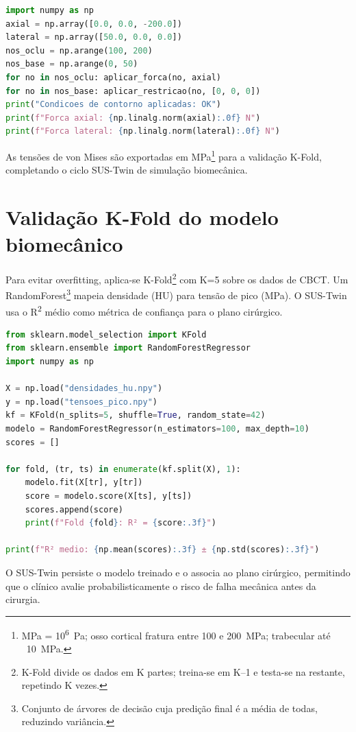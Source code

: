 \begin{lstlisting}[language=Python,caption={Condições de contorno para FEM}]
import numpy as np
axial = np.array([0.0, 0.0, -200.0])
lateral = np.array([50.0, 0.0, 0.0])
nos_oclu = np.arange(100, 200)
nos_base = np.arange(0, 50)
for no in nos_oclu: aplicar_forca(no, axial)
for no in nos_base: aplicar_restricao(no, [0, 0, 0])
print("Condicoes de contorno aplicadas: OK")
print(f"Forca axial: {np.linalg.norm(axial):.0f} N")
print(f"Forca lateral: {np.linalg.norm(lateral):.0f} N")
\end{lstlisting}

As tensões de von Mises são exportadas em MPa\footnote{MPa =
10\textsuperscript{6}~Pa; osso cortical fratura entre 100 e 200~MPa;
trabecular até ~10~MPa.} para a validação K-Fold, completando o ciclo
SUS-Twin de simulação biomecânica.

\section{Validação K-Fold do modelo biomecânico}
Para evitar overfitting, aplica-se K-Fold\footnote{K-Fold divide os dados em K
partes; treina-se em K--1 e testa-se na restante, repetindo K vezes.} com K=5
sobre os dados de CBCT. Um RandomForest\footnote{Conjunto de árvores de decisão
cuja predição final é a média de todas, reduzindo variância.} mapeia densidade
(HU) para tensão de pico (MPa). O SUS-Twin usa o R\textsuperscript{2} médio como métrica de
confiança para o plano cirúrgico.

\begin{lstlisting}[language=Python,caption={Validação K-Fold com RandomForest}]
from sklearn.model_selection import KFold
from sklearn.ensemble import RandomForestRegressor
import numpy as np

X = np.load("densidades_hu.npy")
y = np.load("tensoes_pico.npy")
kf = KFold(n_splits=5, shuffle=True, random_state=42)
modelo = RandomForestRegressor(n_estimators=100, max_depth=10)
scores = []

for fold, (tr, ts) in enumerate(kf.split(X), 1):
    modelo.fit(X[tr], y[tr])
    score = modelo.score(X[ts], y[ts])
    scores.append(score)
    print(f"Fold {fold}: R² = {score:.3f}")

print(f"R² medio: {np.mean(scores):.3f} ± {np.std(scores):.3f}")
\end{lstlisting}

O SUS-Twin persiste o modelo treinado e o associa ao plano cirúrgico,
permitindo que o clínico avalie probabilisticamente o risco de falha
mecânica antes da cirurgia.

